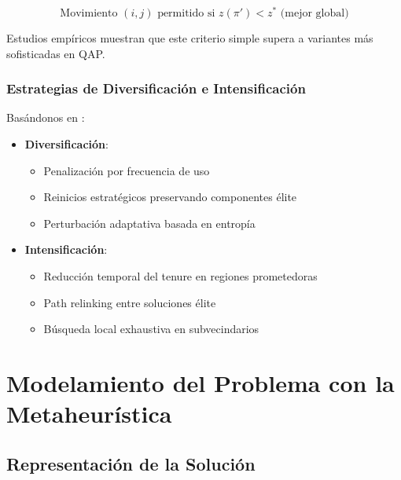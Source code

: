 \documentclass[12pt, a4paper]{article}
\begin{document}
\begin{equation}
\text{Movimiento }(i,j)\text{ permitido si } z(\pi') < z^* \text{ (mejor global)}
\end{equation}

Estudios empíricos \cite{taillard1995} muestran que este criterio simple supera a variantes más sofisticadas en QAP.

\subsubsection{Estrategias de Diversificación e Intensificación}

Basándonos en \cite{glover1997, gendreau2003}:

\begin{itemize}
    \item \textbf{Diversificación}:
    \begin{itemize}
        \item Penalización por frecuencia de uso \cite{kelly1995}
        \item Reinicios estratégicos preservando componentes élite \cite{james2009}
        \item Perturbación adaptativa basada en entropía \cite{battiti1994}
    \end{itemize}
    
    \item \textbf{Intensificación}:
    \begin{itemize}
        \item Reducción temporal del tenure en regiones prometedoras
        \item Path relinking entre soluciones élite \cite{glover2000}
        \item Búsqueda local exhaustiva en subvecindarios
    \end{itemize}
\end{itemize}

\newpage

\section{Modelamiento del Problema con la Metaheurística}

\subsection{Representación de la Solución}
\end{document}
